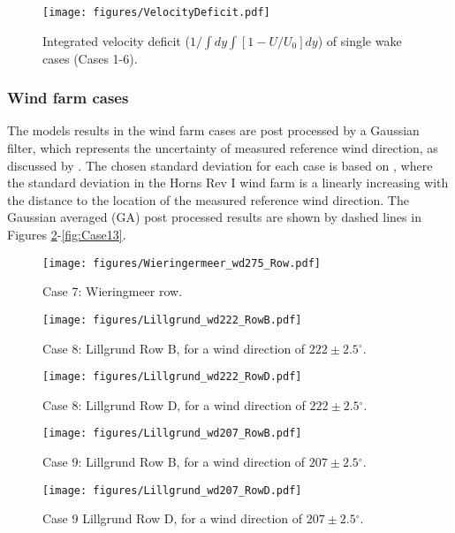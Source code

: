\documentclass[a4paper,oneside]{article}
\newcommand{\degree}{\ensuremath{^\circ}}
\begin{document}
\begin{figure}[h!]
\centering
\texttt{[image: figures/VelocityDeficit.pdf]}
\caption{Integrated velocity deficit ($1/\int{dy}\int{[1-U/U_0]dy}$) of single wake cases (Cases 1-6).}
\label{fig:SingleWakeCasesVelDef}
\end{figure}

\subsubsection{Wind farm cases}
The models results in the wind farm cases are post processed by a Gaussian filter, which represents the uncertainty of measured reference wind direction, as discussed by \citet{Gaumond13}.
The chosen standard deviation for each case is based on \citet{Laan14c}, where the standard deviation in the Horns Rev I wind farm is a linearly increasing with the distance to the location of the measured reference wind direction.
The Gaussian averaged (GA) post processed results are shown by dashed lines in Figures \ref{fig:Case7}-\ref{fig:Case13}.

\begin{figure}[h!]
\centering
\texttt{[image: figures/Wieringermeer\_wd275\_Row.pdf]}
\caption{Case 7: Wieringmeer row.}
\label{fig:Case7}
\end{figure}

\begin{figure}[h!]
\centering
\texttt{[image: figures/Lillgrund\_wd222\_RowB.pdf]}
\caption{Case 8: Lillgrund Row B, for a wind direction of $222\pm2.5\degree$.}
\label{fig:Case8}
\end{figure}

\begin{figure}[h!]
\centering
\texttt{[image: figures/Lillgrund\_wd222\_RowD.pdf]}
\caption{Case 8: Lillgrund Row D, for a wind direction of $222\pm2.5\degree$.}
\label{fig:Case8RowD}
\end{figure}


\begin{figure}[h!]
\centering
\texttt{[image: figures/Lillgrund\_wd207\_RowB.pdf]}
\caption{Case 9: Lillgrund Row B, for a wind direction of $207\pm2.5\degree$.}
\label{fig:Case9RowB}
\end{figure}

\begin{figure}[h!]
\centering
\texttt{[image: figures/Lillgrund\_wd207\_RowD.pdf]}
\caption{Case 9 Lillgrund Row D, for a wind direction of $207\pm2.5\degree$.}
\label{fig:Case9RowD}
\end{figure}
\end{document}
